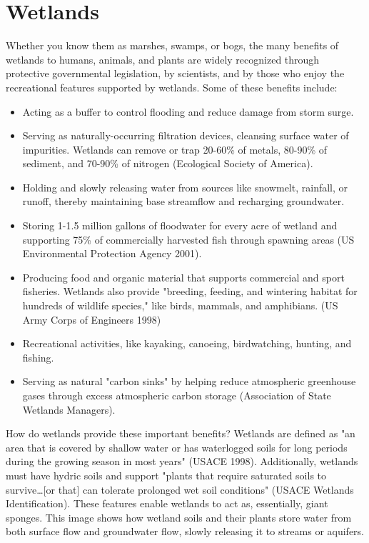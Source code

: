 \section{Wetlands}\label{subsec:wetland}
Whether you know them as marshes, swamps, or bogs, the many benefits of 
wetlands to humans, animals, and plants are widely recognized through 
protective governmental legislation, by scientists, and by those who enjoy the 
recreational features supported by wetlands. Some of these benefits include:
\begin{itemize}
    \item Acting as a buffer to control flooding and reduce damage from storm 
    surge.
    \item Serving as naturally-occurring filtration devices, cleansing surface 
    water of impurities.  Wetlands can remove or trap 20-60\% of metals, 80-90\% 
    of sediment, and 70-90\% of nitrogen (Ecological Society of America).
    \item Holding and slowly releasing water from sources like snowmelt, 
    rainfall, or runoff, thereby maintaining base streamflow and recharging 
    groundwater.
    \item Storing 1-1.5 million gallons of floodwater for every acre of wetland
    and supporting 75\% of commercially harvested fish through spawning areas 
    (US Environmental Protection Agency 2001).
    \item Producing food and organic material that supports commercial and 
    sport fisheries. Wetlands also provide "breeding, feeding, and wintering 
    habitat for hundreds of wildlife species," like birds, mammals, and 
    amphibians. (US Army Corps of Engineers 1998)
    \item Recreational activities, like kayaking, canoeing, birdwatching, 
    hunting, and fishing.
    \item Serving as natural "carbon sinks" by helping reduce atmospheric
    greenhouse gases through excess atmospheric carbon storage (Association 
    of State Wetlands Managers).
\end{itemize}

How do wetlands provide these important benefits? Wetlands are defined as "an 
area that is covered by shallow water or has waterlogged soils for long periods 
during the growing season in most years" (USACE 1998). Additionally, wetlands 
must have hydric soils and support "plants that require saturated soils to 
survive\ldots [or that] can tolerate prolonged wet soil conditions" (USACE 
Wetlands Identification). These features enable wetlands to act as, 
essentially, giant sponges. This image shows how wetland soils and their plants 
store water from both surface flow and groundwater flow, slowly releasing it to 
streams or aquifers.

